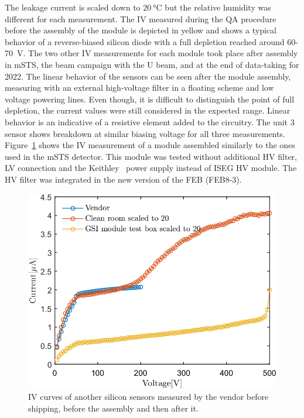 The leakage current is scaled down to $\SI{20}{\celsius}$ but the relative humidity was different for each measurement. The IV measured during the QA procedure before the assembly of the module is depicted in yellow and shows a typical behavior of a reverse-biased silicon diode with a full depletion reached around 60-70~V. The two other IV measurements for each module took place after assembly in \gls{mSTS}, the beam campaign with the U beam, and at the end of data-taking for 2022. The linear behavior of the sensors can be seen after the module assembly, measuring with an external high-voltage filter in a floating scheme and low voltage powering lines. Even though, it is difficult to distinguish the point of full depletion, the current values were still considered in the expected range. Linear behavior is an indicative of a resistive element added to the circuitry. The unit 3 sensor shows breakdown at similar biasing voltage for all three measurements. Figure~\ref{fig_IV_good} shows the IV measurement of a module assembled similarly to the ones used in the \gls{mSTS} detector. This module was tested without additional \gls{HV} filter, \gls{LV} connection and the Keithley~\cite{Keithley} power supply instead of ISEG \gls{HV} module. The \gls{HV} filter was integrated in the new version of the \gls{FEB} (FEB8-3). 

\begin{figure}[!h]
\centering
\includegraphics[width=0.5\columnwidth]{Chapter6/DCS/images/IV/30304Whole.png}
\caption{IV curves of another silicon sensors measured by the vendor before shipping, before the assembly and then after it.} 
\label{fig_IV_good}
\end{figure}

\newpage
